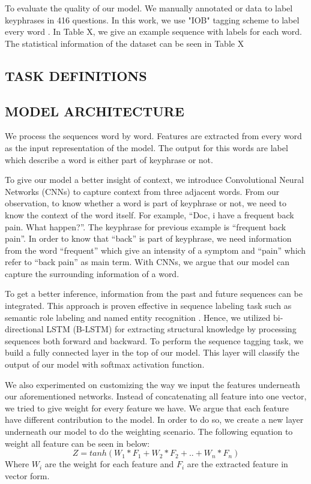 To evaluate the quality of our model. We manually annotated or data to label keyphrases in 416 questions. In this work, we use "IOB" tagging scheme to label every word \cite{collobert2011natural}. In Table X, we give an example sequence with labels for each word. The statistical information of the dataset can be seen in Table X

\subsection{TASK DEFINITIONS}
\subsection{MODEL ARCHITECTURE}
We process the sequences word by word. Features are extracted from every word as the input representation of the model. The output for this words are label which describe a word is either part of keyphrase or not.

To give our model a better insight of context, we introduce Convolutional Neural Networks (CNNs) to capture context from three adjacent words.  From our observation, to know whether a word is part of keyphrase or not, we need to know the context of the word itself. For example, “Doc, i have a frequent back pain. What happen?”. The keyphrase for previous example is “frequent back pain”. In order to know that “back” is part of keyphrase, we need information from the word “frequent” which give an intensity of a symptom and “pain” which refer to “back pain” as main term. With CNNs, we argue that our model can capture the surrounding information of a word.

To get a better inference, information from the past and future sequences can be integrated. This approach is proven effective  in sequence labeling task such as semantic role labeling \cite{SMRzhou2015end} and named entity recognition \cite{ma2016end}. Hence, we utilized  bi-directional LSTM (B-LSTM) for extracting structural knowledge by processing sequences both forward and backward.
To perform the sequence tagging task, we build a fully connected layer in the top of our model. This layer will classify the output of our model with softmax activation function.

We also experimented on customizing the way we input the features underneath our aforementioned networks. Instead of concatenating all feature into one vector, we tried to give weight for every feature we have. We argue that each feature have different contribution to the model. In order to do so, we create a new layer underneath our model to do the weighting scenario. The following equation to weight all feature can be seen in below:
\begin{equation}
	Z =  tanh(W _{1}*F_{1} + W_{2}*F_{2} + .. + W_{n}*F_{n})
\end{equation}
Where $W_{i}$ are the weight for each feature and $F_{i}$ are the extracted feature in vector form.
